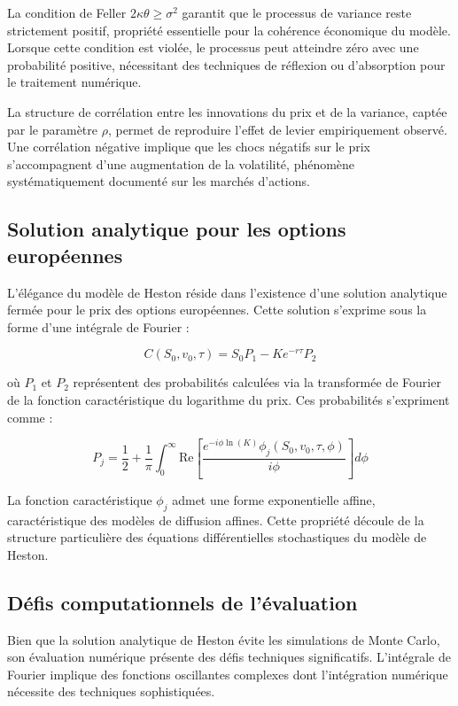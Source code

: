 La condition de Feller $2\kappa\theta \geq \sigma^2$ garantit que le processus de variance reste strictement positif, propriété essentielle pour la cohérence économique du modèle. Lorsque cette condition est violée, le processus peut atteindre zéro avec une probabilité positive, nécessitant des techniques de réflexion ou d'absorption pour le traitement numérique.

La structure de corrélation entre les innovations du prix et de la variance, captée par le paramètre $\rho$, permet de reproduire l'effet de levier empiriquement observé. Une corrélation négative implique que les chocs négatifs sur le prix s'accompagnent d'une augmentation de la volatilité, phénomène systématiquement documenté sur les marchés d'actions.

\subsection{Solution analytique pour les options européennes}

L'élégance du modèle de Heston réside dans l'existence d'une solution analytique fermée pour le prix des options européennes. Cette solution s'exprime sous la forme d'une intégrale de Fourier :

\begin{equation}
C(S_0, v_0, \tau) = S_0 P_1 - Ke^{-r\tau} P_2
\end{equation}

où $P_1$ et $P_2$ représentent des probabilités calculées via la transformée de Fourier de la fonction caractéristique du logarithme du prix. Ces probabilités s'expriment comme :

\begin{equation}
P_j = \frac{1}{2} + \frac{1}{\pi} \int_0^{\infty} \text{Re}\left[\frac{e^{-i\phi \ln(K)}\phi_j(S_0, v_0, \tau, \phi)}{i\phi}\right] d\phi
\end{equation}

La fonction caractéristique $\phi_j$ admet une forme exponentielle affine, caractéristique des modèles de diffusion affines. Cette propriété découle de la structure particulière des équations différentielles stochastiques du modèle de Heston.

\subsection{Défis computationnels de l'évaluation}

Bien que la solution analytique de Heston évite les simulations de Monte Carlo, son évaluation numérique présente des défis techniques significatifs. L'intégrale de Fourier implique des fonctions oscillantes complexes dont l'intégration numérique nécessite des techniques sophistiquées.

